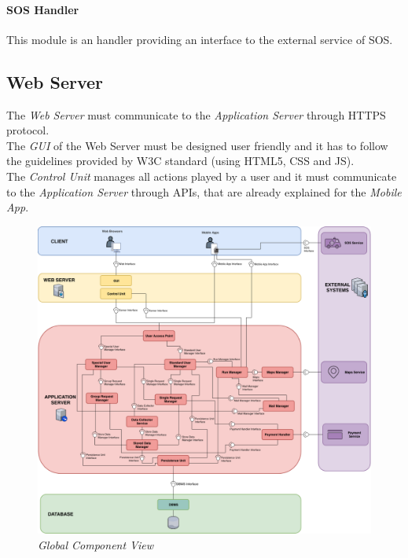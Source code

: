 \paragraph{SOS Handler}
This module is an handler providing an interface to the external service of SOS.

\subsection{Web Server}
The \textit{Web Server} must communicate to the \textit{Application Server} through HTTPS protocol.\\
The \textit{GUI} of the \textit{}{Web Server} must be designed user friendly and it has to follow the guidelines provided by W3C standard (using HTML5, CSS and JS).\\
The \textit{Control Unit} manages all actions played by a user and it must communicate to the \textit{Application Server} through APIs, that are already explained for the \textit{Mobile App}.

\begin{figure}[H]
  \begin{center}
  	\includegraphics[width=\textwidth]{./img/GlobalComponent.png}
    \hspace{0.05\linewidth}
    \centering
    \caption{\textit{Global Component View}}
		\label{img:GlobalComponent}
    \end{center}
\end{figure}


